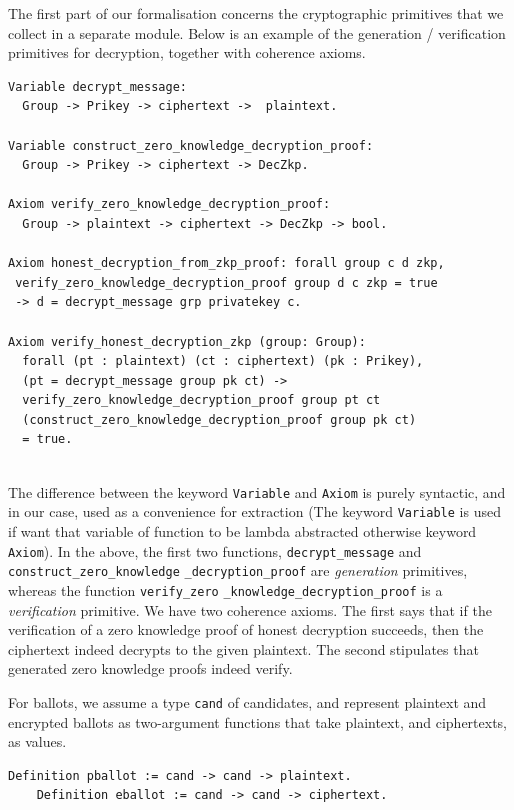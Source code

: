 The first part of our formalisation concerns the cryptographic
primitives that we collect in a separate module. Below is an example
of the generation / verification primitives for decryption, together
with coherence axioms.
\begin{lstlisting}[frame=single,basicstyle=\ttfamily\footnotesize]
Variable decrypt_message: 
  Group -> Prikey -> ciphertext ->  plaintext.

Variable construct_zero_knowledge_decryption_proof:
  Group -> Prikey -> ciphertext -> DecZkp.

Axiom verify_zero_knowledge_decryption_proof:
  Group -> plaintext -> ciphertext -> DecZkp -> bool.

Axiom honest_decryption_from_zkp_proof: forall group c d zkp, 
 verify_zero_knowledge_decryption_proof group d c zkp = true 
 -> d = decrypt_message grp privatekey c.
 
Axiom verify_honest_decryption_zkp (group: Group):
  forall (pt : plaintext) (ct : ciphertext) (pk : Prikey),
  (pt = decrypt_message group pk ct) ->
  verify_zero_knowledge_decryption_proof group pt ct 
  (construct_zero_knowledge_decryption_proof group pk ct) 
  = true.
  

\end{lstlisting}
  
\noindent
The difference between the keyword \texttt{Variable} and \texttt{Axiom}
is purely syntactic, and in our case, used as a convenience for 
extraction (The keyword  \texttt{Variable} is used if want that variable of function 
to be lambda abstracted otherwise keyword \texttt{Axiom}). In
the above, the first two functions, \texttt{decrypt\_message} and
\texttt{construct\_zero\_knowledge} \texttt{\_decryption\_proof} are
\emph{generation} primitives, whereas the function 
\texttt{verify\_zero} \texttt{\_knowledge\_decryption\_proof} is a
\emph{verification} primitive. We have two coherence axioms. The
first says that if the verification of a zero knowledge proof of
honest decryption succeeds, then the ciphertext indeed decrypts to
the given plaintext. The second stipulates that generated zero
knowledge proofs indeed verify. 

For ballots, we assume a type \texttt{cand} of candidates, and
represent plaintext and encrypted ballots as two-argument functions
that take plaintext, and ciphertexts, as values. 
\begin{lstlisting}[frame=single,basicstyle=\ttfamily\footnotesize]
    Definition pballot := cand -> cand -> plaintext.
    Definition eballot := cand -> cand -> ciphertext.
\end{lstlisting}


